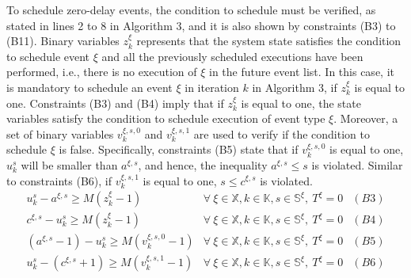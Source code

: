 \documentclass[suppldata]{interact}
\theoremstyle{plain}
\theoremstyle{definition}
\theoremstyle{remark}
\begin{document}
To schedule zero-delay events, the condition to schedule must be verified, as stated in lines 2 to 8 in Algorithm 3, and it is also shown by constraints (B3) to (B11). Binary variables $z^{\xi}_{k}$ represents that the system state satisfies the condition to schedule event $\xi$ and all the previously scheduled executions have been performed, i.e., there is no execution of $\xi$ in the future event list. In this case, it is mandatory to schedule an event ${\xi}$ in iteration $k$ in Algorithm 3, if $z^{\xi}_{k}$ is equal to one.
Constraints (B3) and (B4) imply that if $z^{\xi}_k$ is equal to one, the state variables satisfy the condition to schedule execution of event type $\xi$. Moreover, a set of binary variables $v^{\xi,s,0}_k$ and $v^{\xi,s,1}_k$ are used to verify if the condition to schedule $\xi$ is false. Specifically, constraints (B5) state that if  $v^{\xi,s,0}_k$ is equal to one, $u^s_k$ will be smaller than $a^{\xi,s}$, and hence, the inequality $a^{\xi,s}\le s$ is violated. Similar to constraints (B6), if $v^{\xi,s,1}_k$ is equal to one, $s \le c^{\xi,s}$ is violated. %
\begin{eqnarray}
	u^s_k - a^{\xi,s} \ge M(z^{\xi}_{k}-1)&\forall\ \xi\in \mathbb{X},k\in \mathbb{K},s\in \mathbb{S^{\xi}},\ T^{\xi} = 0&(B3)\nonumber\\
	c^{\xi,s} - u^s_k \ge M(z^{\xi}_{k}-1)&\forall\ \xi\in \mathbb{X},k\in \mathbb{K},s\in \mathbb{S^{\xi}},\ T^{\xi} = 0&(B4)\nonumber\\
	( a^{\xi,s}-1) - u^s_k \ge M(v^{\xi,s,0}_k-1) & \forall\ \xi\in \mathbb{X},k\in \mathbb{K},s\in \mathbb{S^{\xi}},\ T^{\xi} = 0 &(B5)\nonumber\\
	u^s_k -  (c^{\xi,s}+1) \ge M(v^{\xi,s,1}_k-1) & \forall\ \xi\in \mathbb{X},k\in \mathbb{K},s\in \mathbb{S^{\xi}},\ T^{\xi} = 0 &(B6)\nonumber
\end{eqnarray}
\end{document}
